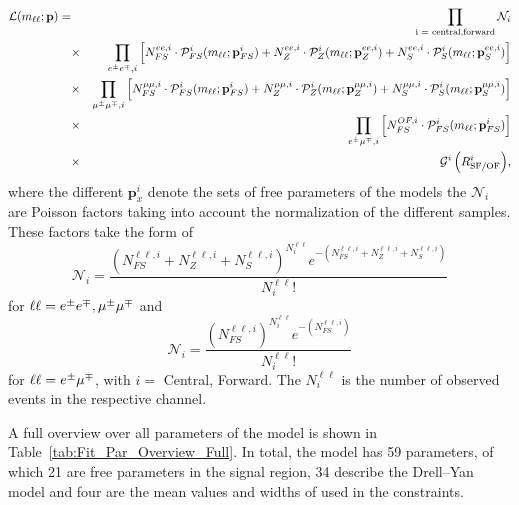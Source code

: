 \begin{eqnarray*}
{\mathcal{L}}(m_{\ell\ell};\mathbf{p}) =&&   \prod_{\text{i = central,forward}} \mathcal{N}_i\\
                        &\times& \prod_{\EE,i}\left[N_{FS}^{ee,i} \cdot {\mathcal{P}}_{FS}^i(m_{\ell\ell};\mathbf{p}_{FS}^i) %
                                                  + N_{Z}^{ee,i} \cdot {\mathcal{P}}_{Z}^i(m_{\ell\ell};\mathbf{p}_{Z}^{ee,i}) %
                                                  + N_{S}^{ee,i} \cdot {\mathcal{P}}_{S}^i(m_{\ell\ell};\mathbf{p}_{S}^{ee,i})\right] \\
                        &\times& \prod_{\MM,i}\left[N_{FS}^{\mu\mu,i} \cdot {\mathcal{P}}_{FS}^i(m_{\ell\ell};\mathbf{p}_{FS}^i) %
                                                  + N_{Z}^{\mu\mu,i} \cdot {\mathcal{P}}_{Z}^i(m_{\ell\ell};\mathbf{p}_{Z}^{\mu\mu,i}) %
                                                  + N_{S}^{\mu\mu,i} \cdot {\mathcal{P}}_{S}^i(m_{\ell\ell};\mathbf{p}_{S}^{\mu\mu,i})\right] \\
                        &\times& \prod_{\EM,i}\left[N_{FS}^{OF,i} \cdot {\mathcal{P}}_{FS}^i(m_{\ell\ell};\mathbf{p}_{FS}^i)\right] \\   
                        &\times& {\mathcal{G}^i\left(\Rsfof^i\right)}, \\
\end{eqnarray*}
where the different $\mathbf{p}^i_{x}$ denote the sets of free parameters of the models the $\mathcal{N}_i$ are Poisson factors taking into account the normalization of the different samples. These factors take the form of
\begin{equation*}
\mathcal{N}_i = \frac{(N_{FS}^{\ell\ell,i} + N_{Z}^{\ell\ell,i} + N_{S}^{\ell\ell,i})^{N_i^{\ell\ell}} e^{-(N_{FS}^{\ell\ell,i} + N_{Z}^{\ell\ell,i} + N_{S}^{\ell\ell,i})}}{N_i^{\ell\ell}!}
\end{equation*} 
for $\ell\ell = e^\pm e^\mp, \mu^\pm\mu^\mp$ and
\begin{equation*}
\mathcal{N}_i = \frac{(N_{FS}^{\ell\ell,i})^{N_i^{\ell\ell}} e^{-(N_{FS}^{\ell\ell,i})}}{N_i^{\ell\ell}!}
\end{equation*}
for $\ell\ell = e^\pm\mu^\mp$, with $i =$ Central, Forward. The $N_i^{\ell\ell}$ is the number of observed events in the respective channel. 

A full overview over all parameters of the model is shown in Table~\ref{tab:Fit_Par_Overview_Full}. In total, the model has 59 parameters, of which 21 are free parameters in the signal region, 34 describe the Drell--Yan model and four are the mean values and widths of \Rsfof used in the constraints. 


